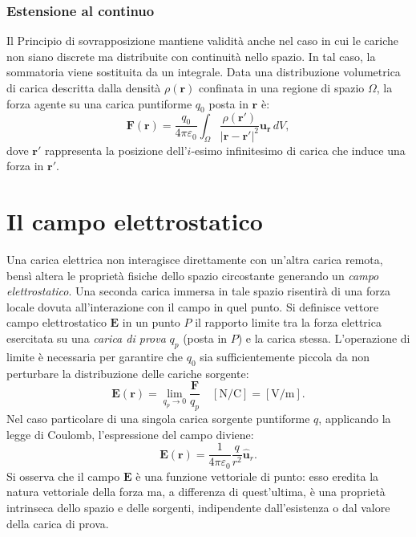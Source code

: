 \documentclass[a4paper,11pt]{report}
\begin{document}
\subsubsection{Estensione al continuo}
Il Principio di sovrapposizione mantiene validità anche nel caso in cui le cariche non siano discrete ma distribuite con continuità nello spazio. In tal caso, la sommatoria viene sostituita da un integrale.
Data una distribuzione volumetrica di carica descritta dalla densità $\rho(\bm{r})$ confinata in una regione di spazio $\Omega$, la forza agente su una carica puntiforme $q_0$ posta in $\bm{r}$ è:
\begin{equation}
    \bm{F}(\bm{r}) = \frac{q_0}{4\pi\varepsilon_0} \int_\Omega \frac{\rho(\bm{r}')}{|\bm{r} - \bm{r}'|^2} \bm{u_r}  \, dV,
\end{equation}
dove $\bm{r'}$ rappresenta la posizione dell'$i$-esimo infinitesimo di carica che induce una forza in $\bm{r}'$. 

\section{Il campo elettrostatico}
Una carica elettrica non interagisce direttamente con un'altra carica remota, bensì altera le proprietà fisiche dello spazio circostante generando un \textit{campo elettrostatico}. Una seconda carica immersa in tale spazio risentirà di una forza locale dovuta all'interazione con il campo in quel punto.
Si definisce vettore campo elettrostatico $\bm{E}$ in un punto $P$ il rapporto limite tra la forza elettrica esercitata su una \textit{carica di prova} $q_p$ (posta in $P$) e la carica stessa. L'operazione di limite è necessaria per garantire che $q_0$ sia sufficientemente piccola da non perturbare la distribuzione delle cariche sorgente:
\begin{equation}
    \boxed{\bm{E}(\bm{r}) = \lim_{q_p \to 0} \frac{\bm{F}}{q_p}} \quad [\si{\newton\per\coulomb}] = [\si{\volt\per\meter}].
\end{equation}
Nel caso particolare di una singola carica sorgente puntiforme $q$, applicando la legge di Coulomb, l'espressione del campo diviene:
\begin{equation}
    \bm{E}(\bm{r}) = \frac{1}{4 \pi \varepsilon_0}\frac{q}{r^2}\hat{\bm{u}}_r.
\end{equation}
Si osserva che il campo $\bm{E}$ è una funzione vettoriale di punto: esso eredita la natura vettoriale della forza ma, a differenza di quest'ultima, è una proprietà intrinseca dello spazio e delle sorgenti, indipendente dall'esistenza o dal valore della carica di prova.
\end{document}
